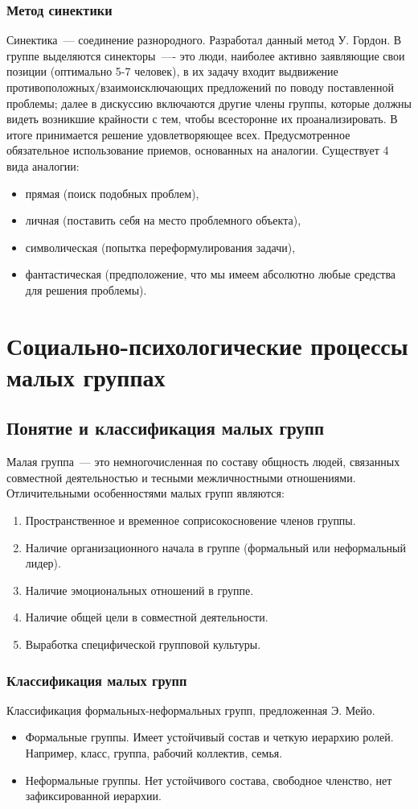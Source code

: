 \subsubsection{Метод синектики}
Синектика~--- соединение разнородного. Разработал данный метод У. Гордон. В группе выделяются синекторы~---- это люди, наиболее активно заявляющие свои позиции (оптимально 5-7 человек), в их задачу входит выдвижение противоположных/взаимоисключающих предложений по поводу поставленной проблемы; далее в дискуссию включаются другие члены группы, которые должны видеть возникшие крайности с тем, чтобы всесторонне их проанализировать. В итоге принимается решение удовлетворяющее всех. Предусмотренное обязательное использование приемов, основанных на аналогии. Существует 4 вида аналогии:
\begin{itemize}
	\item прямая (поиск подобных проблем),
	\item личная (поставить себя на место проблемного объекта),
	\item символическая (попытка переформулирования задачи),
	\item фантастическая (предположение, что мы имеем абсолютно любые средства для решения проблемы).
\end{itemize}

\section{Социально-психологические процессы  малых группах}
\subsection{Понятие и классификация малых групп}
Малая группа~--- это немногочисленная по составу общность людей, связанных совместной деятельностью и тесными межличностными отношениями. Отличительными особенностями малых групп являются:
\begin{enumerate}
	\item Пространственное и временное соприсокосновение членов группы.
	\item Наличие организационного начала в группе (формальный или неформальный лидер).
	\item Наличие эмоциональных отношений в группе.
	\item Наличие общей цели в совместной деятельности.
	\item Выработка специфической групповой культуры.
\end{enumerate}
\subsubsection{Классификация малых групп}
Классификация формальных-неформальных групп, предложенная Э. Мейо.
\begin{itemize}
	\item Формальные группы. Имеет устойчивый состав и четкую иерархию ролей. Например, класс, группа, рабочий коллектив, семья.
	\item Неформальные группы. Нет устойчивого состава, свободное членство, нет зафиксированной иерархии.
\end{itemize}

